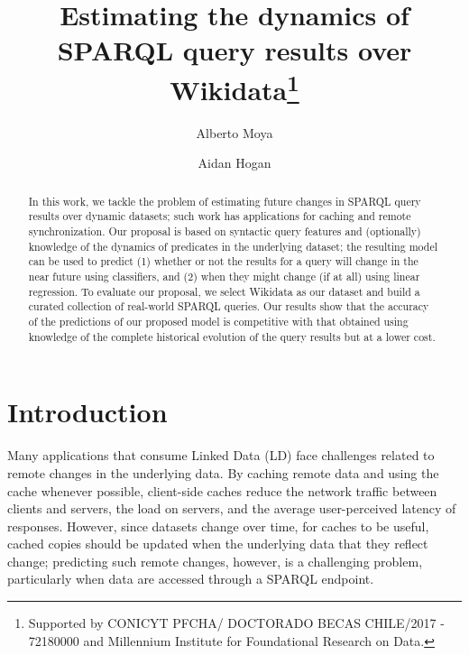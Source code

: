 \documentclass[runningheads]{llncs}
\begin{document}
%
\title{Estimating the dynamics of SPARQL query results over Wikidata\thanks{Supported by CONICYT PFCHA/ DOCTORADO BECAS CHILE/2017 - 72180000 and Millennium Institute for Foundational Research on Data.}}
%
%
\author{Alberto Moya \and
Aidan Hogan}
%
%
%
\maketitle              %
%
\begin{abstract}
In this work, we tackle the problem of estimating future changes in SPARQL query results over dynamic datasets; such work has applications for caching and remote synchronization. Our proposal is based on syntactic query features and (optionally) knowledge of the dynamics of predicates in the underlying dataset; the resulting model can be used to predict (1) whether or not the results for a query will change in the near future using classifiers, and (2) when they might change (if at all) using linear regression. To evaluate our proposal, we select Wikidata as our dataset and build a curated collection of real-world SPARQL queries. Our results show that the accuracy of the predictions of our proposed model is competitive with that obtained using knowledge of the complete historical evolution of the query results but at a lower cost.

\end{abstract}
%
%
\section{Introduction}
\label{sec:intro}
%
Many applications that consume Linked Data (LD) face challenges related to remote changes in the underlying data. By caching remote data and using the cache whenever possible, client-side caches reduce the network traffic between clients and servers, the load on servers, and the average user-perceived latency of responses. However, since datasets change over time, for caches to be useful, cached copies should be updated when the underlying data that they reflect change; predicting such remote changes, however, is a challenging problem, particularly when data are accessed through a SPARQL endpoint.
\end{document}
